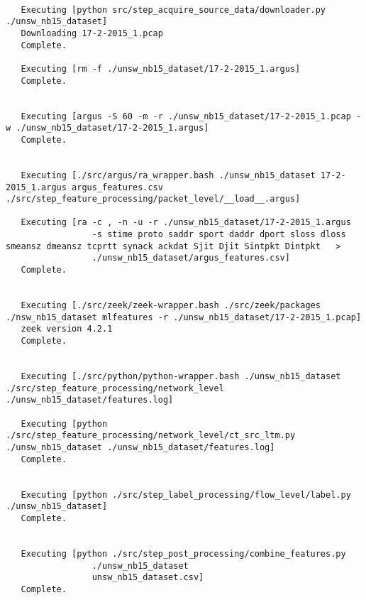 \documentclass[sigconf, anonymous, screen]{acmart}
\begin{document}
\begin{lstlisting}[float=*, label=lst:sampleoutput, caption={
    The expected output seen in a terminal window after running our sample implementation.
    Seeing the actual commands that run alleviates any ambiguity regarding how a dataset was created in comparison to simply describing the methodology.
    Note that we have added some line breaks in the listing to make the output easier to view.
    }, captionpos=b, basicstyle=\tiny, backgroundcolor=\color{gray!10!white}, frame=stb, breaklines=True]

   Executing [python src/step_acquire_source_data/downloader.py ./unsw_nb15_dataset]
   Downloading 17-2-2015_1.pcap
   Complete.
   
   Executing [rm -f ./unsw_nb15_dataset/17-2-2015_1.argus]
   Complete.
   
   
   Executing [argus -S 60 -m -r ./unsw_nb15_dataset/17-2-2015_1.pcap -w ./unsw_nb15_dataset/17-2-2015_1.argus]
   Complete.
   
   
   Executing [./src/argus/ra_wrapper.bash ./unsw_nb15_dataset 17-2-2015_1.argus argus_features.csv ./src/step_feature_processing/packet_level/__load__.argus]
   
   Executing [ra -c , -n -u -r ./unsw_nb15_dataset/17-2-2015_1.argus 
                 -s stime proto saddr sport daddr dport sloss dloss smeansz dmeansz tcprtt synack ackdat Sjit Djit Sintpkt Dintpkt   > 
                 ./unsw_nb15_dataset/argus_features.csv]
   Complete.
   
   
   Executing [./src/zeek/zeek-wrapper.bash ./src/zeek/packages ./nsw_nb15_dataset mlfeatures -r ./unsw_nb15_dataset/17-2-2015_1.pcap]
   zeek version 4.2.1
   Complete.
   
   
   Executing [./src/python/python-wrapper.bash ./unsw_nb15_dataset ./src/step_feature_processing/network_level ./unsw_nb15_dataset/features.log]
   
   Executing [python ./src/step_feature_processing/network_level/ct_src_ltm.py ./unsw_nb15_dataset ./unsw_nb15_dataset/features.log]
   Complete.
   
   
   Executing [python ./src/step_label_processing/flow_level/label.py ./unsw_nb15_dataset]
   Complete.
   
   
   Executing [python ./src/step_post_processing/combine_features.py 
                 ./unsw_nb15_dataset 
                 unsw_nb15_dataset.csv]
   Complete.

\end{lstlisting}
\end{document}

